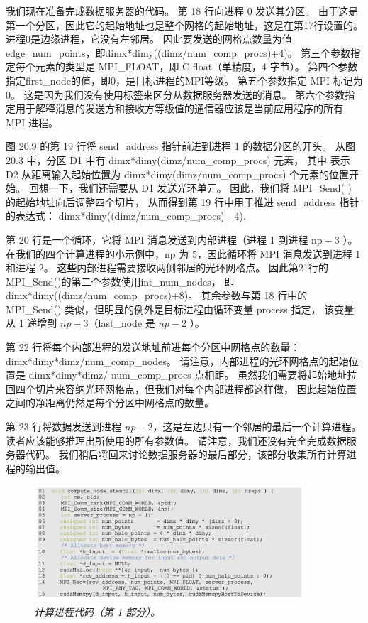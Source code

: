 我们现在准备完成数据服务器的代码。 第 18 行向进程 0 发送其分区。 
由于这是第一个分区，因此它的起始地址也是整个网格的起始地址，这是在第17行设置的。进程0是边缘进程，它没有左邻居。 
因此要发送的网格点数量为值edge\_num\_points，即dimx*dimy((dimz/num\_comp\_procs)+4)。 
第三个参数指定每个元素的类型是 MPI\_FLOAT，即 C float（单精度，4 字节）。 
第四个参数指定first\_node的值，即0，是目标进程的MPI等级。 第五个参数指定 MPI 标记为 0。 
这是因为我们没有使用标签来区分从数据服务器发送的消息。 
第六个参数指定用于解释消息的发送方和接收方等级值的通信器应该是当前应用程序的所有 MPI 进程。

图 20.9 的第 19 行将 send\_address 指针前进到进程 1 的数据分区的开头。
从图 20.3 中，分区 D1 中有 dimx*dimy(dimz/num\_comp\_procs) 元素，
其中 表示 D2 从距离输入起始位置为 dimx*dimy(dimz/num\_comp\_procs) 个元素的位置开始。 
回想一下，我们还需要从 D1 发送光环单元。 因此，我们将 MPI\_Send( ) 的起始地址向后调整四个切片，
从而得到第 19 行中用于推进 send\_address 指针的表达式： dimx*dimy((dimz/num\_comp\_procs) - 4).

第 20 行是一个循环，它将 MPI 消息发送到内部进程（进程 1 到进程 $\mathrm{np}-3$ ）。 
在我们的四个计算进程的小示例中，np 为 5，因此循环将 MPI 消息发送到进程 1 和进程 2。
这些内部进程需要接收两侧邻居的光环网格点。 因此第21行的MPI\_Send()的第二个参数使用int\_num\_nodes，
即dimx*dimy((dimz/num\_comp\_procs)+8)。 
其余参数与第 18 行中的 MPI\_Send() 类似，但明显的例外是目标进程由循环变量 process 指定，
该变量从 1 递增到 $n p-3$（last\_node 是 $n p-2$ ）。

第 22 行将每个内部进程的发送地址前进每个分区中网格点的数量：dimx*dimy*dimz/num\_comp\_nodes。 
请注意，内部进程的光环网格点的起始位置是 dimx*dimy*dimz/ num\_comp\_procs 点相距。 
虽然我们需要将起始地址拉回四个切片来容纳光环网格点，但我们对每个内部进程都这样做，
因此起始位置之间的净距离仍然是每个分区中网格点的数量。

第 23 行将数据发送到进程 $n p-2$，这是左边只有一个邻居的最后一个计算进程。 读者应该能够推理出所使用的所有参数值。 
请注意，我们还没有完全完成数据服务器代码。 我们稍后将回来讨论数据服务器的最后部分，该部分收集所有计算进程的输出值。

\begin{figure}[H]
	\centering
	\includegraphics[width=0.9\textwidth]{figs/F20.10.png}
	\caption{\textit{计算进程代码（第 1 部分）。}}
\end{figure}

